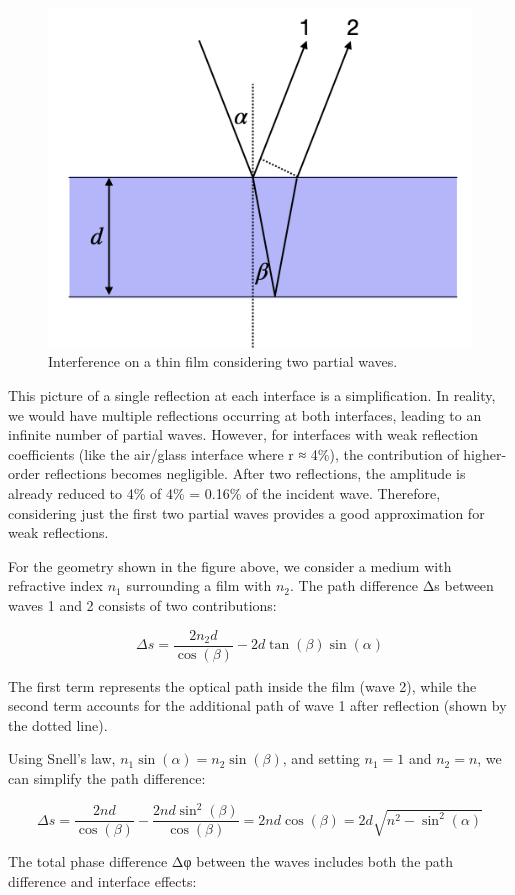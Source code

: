 \documentclass[
  a4paper,
]{book}
\begin{document}
\begin{figure}[H]

{\centering \includegraphics[width=0.5\linewidth,height=\textheight,keepaspectratio]{wave-optics/img/thin_film.png}

}

\caption{Interference on a thin film considering two partial waves.}

\end{figure}%

This picture of a single reflection at each interface is a
simplification. In reality, we would have multiple reflections occurring
at both interfaces, leading to an infinite number of partial waves.
However, for interfaces with weak reflection coefficients (like the
air/glass interface where r ≈ 4\%), the contribution of higher-order
reflections becomes negligible. After two reflections, the amplitude is
already reduced to 4\% of 4\% = 0.16\% of the incident wave. Therefore,
considering just the first two partial waves provides a good
approximation for weak reflections.

For the geometry shown in the figure above, we consider a medium with
refractive index \(n_1\) surrounding a film with \(n_2\). The path
difference Δs between waves 1 and 2 consists of two contributions:

\[
\Delta s=\frac{2n_2d}{\cos(\beta)}-2d\tan(\beta)\sin(\alpha)
\]

The first term represents the optical path inside the film (wave 2),
while the second term accounts for the additional path of wave 1 after
reflection (shown by the dotted line).

Using Snell's law, \(n_1\sin(\alpha) = n_2\sin(\beta)\), and setting
\(n_1 = 1\) and \(n_2 = n\), we can simplify the path difference:

\[
\Delta s =\frac{2nd}{\cos(\beta)}-\frac{2nd\sin^2(\beta)}{\cos(\beta)}=2n d \cos(\beta)=2d\sqrt{n^2-\sin^2(\alpha)}
\]

The total phase difference Δφ between the waves includes both the path
difference and interface effects:
\end{document}
